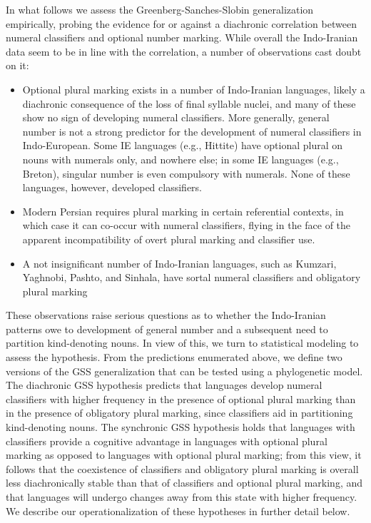 \documentclass[11pt]{article}
\begin{document}
In what follows we assess the Greenberg-Sanches-Slobin generalization empirically, probing the evidence for or against a diachronic correlation between 
numeral classifiers and optional number marking. While overall the Indo-Iranian data seem to be in line with the correlation, a number of observations cast doubt on it:
\begin{itemize}
\item Optional plural marking exists in a number of Indo-Iranian languages, likely a diachronic consequence of the loss of final syllable nuclei, and many of these show no sign of developing numeral classifiers. More generally, general number is not a strong predictor for the development of numeral classifiers in Indo-European. Some IE languages (e.g., Hittite) have optional plural on nouns with numerals only, and nowhere else; in some IE languages (e.g., Breton), singular number is even compulsory with numerals. None of these languages, however, developed classifiers.

\item Modern Persian requires plural marking in certain referential contexts, in which case it can co-occur with numeral classifiers, flying in the face of the apparent incompatibility of overt plural marking and classifier use.

\item %
A not insignificant number of Indo-Iranian languages, such as Kumzari, Yaghnobi, Pashto, and Sinhala, have sortal numeral classifiers and obligatory plural marking


\end{itemize}
These observations raise serious questions as to 
whether 
the Indo-Iranian patterns 
owe to 
development of general number and a subsequent need to partition kind-denoting nouns. 
In view of this, we turn to statistical modeling to assess the hypothesis. 
From the predictions enumerated above, we define two versions of the GSS generalization that can be tested using a phylogenetic model. The {\sc diachronic} GSS hypothesis predicts that languages develop numeral classifiers with higher frequency in the presence of optional plural marking than in the presence of obligatory plural marking, since classifiers aid in partitioning kind-denoting nouns. The {\sc synchronic} GSS hypothesis holds that languages with classifiers provide a cognitive advantage in languages with optional plural marking as opposed to languages with optional plural marking; from this view, it follows that the coexistence of classifiers and obligatory plural marking is overall less diachronically stable than that of classifiers and optional plural marking, and that languages will undergo changes away from this state with higher frequency. We describe our operationalization of these hypotheses in further detail below.
\end{document}
